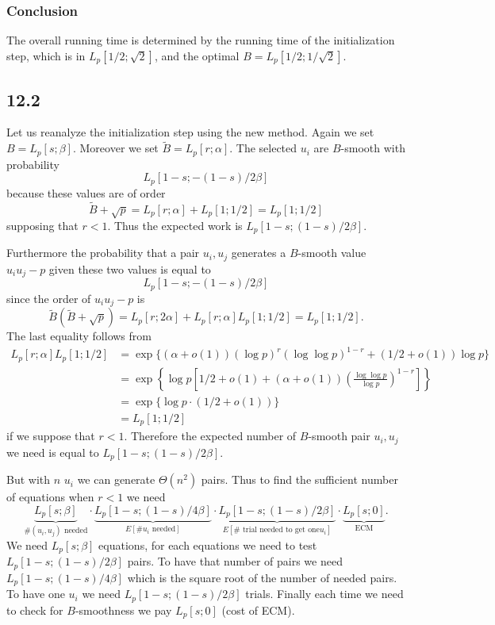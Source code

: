 \documentclass[12pt,a4paper]{article}
\newcommand {\Lfunc}[2]{L_p[#1;#2]}
\newcommand {\Ls}{\Lfunc{s}{\beta}}
\newcommand {\Lr}{\Lfunc{r}{\alpha}}
\begin{document}
\subsubsection{Conclusion}
The overall running time is determined by the running time of the initialization step, which is in $\Lfunc{1/2}{\sqrt{2}}$, and the optimal $B = \Lfunc{1/2}{1/\sqrt{2}}$.



\subsection{12.2}
Let us reanalyze the initialization step using the new method. 
Again we set $B=\Ls$. Moreover we set $\tilde{B} = \Lr$.
The selected $u_i$ are $B$-smooth with probability 
\[
    \Lfunc{1-s}{-(1-s)/2\beta}
\] 
because these values are of order 
\[
    \tilde{B} + \sqrt{p} = \Lr + \Lfunc{1}{1/2} = \Lfunc{1}{1/2}
\]
supposing that $r < 1$.
Thus the expected work is %
$\Lfunc{1-s}{(1-s)/2\beta}$.

Furthermore the probability that a pair $u_i,u_j$ generates a $B$-smooth value $u_iu_j -p$ given these two values is equal to
\[
    \Lfunc{1-s}{-(1-s)/2\beta}
\]
since the order of $u_iu_j -p$ is 
\[
    \tilde{B}(\tilde{B} + \sqrt{p}) = \Lfunc{r}{2\alpha} + \Lr \Lfunc{1}{1/2} = \Lfunc{1}{1/2}.
\]
The last equality follows from
\[
    \begin{split}
        \Lr\Lfunc{1}{1/2} &= \exp\{(\alpha + o(1))(\log p)^r (\log\log p)^{1-r} + (1/2 + o(1))\log p\}\\
                          &= \exp\left\{\log p \left[ 1/2 + o(1) + (\alpha + o(1))\left(\frac{\log\log p}{\log p}\right)^{1-r} \right]\right\}\\
                          &= \exp\{\log p\cdot (1/2 + o(1))\}\\
                          &= \Lfunc{1}{1/2}
    \end{split}
\]
if we suppose that $r < 1$. 
Therefore the expected number of $B$-smooth pair $u_i,u_j$ we need is equal to $\Lfunc{1-s}{(1-s)/2\beta}$.

But with $n$ $u_i$ we can generate $\Theta(n^2)$ pairs.
Thus to find the sufficient number of equations when $r < 1$ we need
\[
    \underbrace{\Lfunc{s}{\beta}}_{\#(u_i,u_j)\text{ needed}} \cdot 
    \underbrace{\Lfunc{1-s}{(1-s)/4\beta}}_{E[\# u_i\text{ needed}]} \cdot 
    \underbrace{\Lfunc{1-s}{(1-s)/2\beta}}_{E[\# \text{ trial needed to get one} u_i]} \cdot 
    \underbrace{\Lfunc{s}{0}}_{\text{ECM}}.
\]
We need $\Lfunc{s}{\beta}$ equations, for each equations we need to test $\Lfunc{1-s}{(1-s)/2\beta}$ pairs. To have that number of pairs
we need $\Lfunc{1-s}{(1-s)/4\beta}$ which is the square root of the number of needed pairs. To have one $u_i$ we need $\Lfunc{1-s}{(1-s)/2\beta}$ trials.
Finally each time we need to check for $B$-smoothness we pay $\Lfunc{s}{0}$ (cost of ECM).
\end{document}
